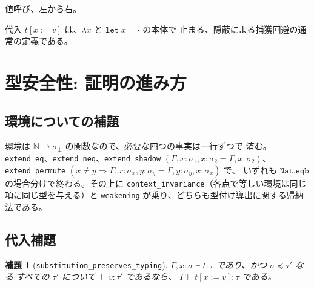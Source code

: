 \documentclass[11pt,a4paper]{ltjsarticle}
\newtheorem{lemma}[theorem]{補題}
\newcommand{\inst}{\preceq}
\newcommand{\subst}[3]{#1[#2 := #3]}
\newcommand{\step}{\longrightarrow}
\begin{document}
値呼び、左から右。


代入 $\subst{t}{x}{v}$ は、$\lambda x$ と $\mathtt{let}\;x = \cdot$ の本体で
止まる、隠蔽による捕獲回避の通常の定義である。

\section{型安全性: 証明の進み方}
\label{sec:safe-proof}

\subsection{環境についての補題}

環境は $\mathbb{N} \to \sigma_\bot$ の関数なので、必要な四つの事実は一行ずつで
済む。\texttt{extend\_eq}、\texttt{extend\_neq}、\texttt{extend\_shadow}
$(\Gamma, x{:}\sigma_1, x{:}\sigma_2 = \Gamma, x{:}\sigma_2)$、
\texttt{extend\_permute} $(x \neq y \Rightarrow
\Gamma, x{:}\sigma_x, y{:}\sigma_y = \Gamma, y{:}\sigma_y, x{:}\sigma_x)$ で、
いずれも $\mathtt{Nat.eqb}$ の場合分けで終わる。その上に
\texttt{context\_invariance}（各点で等しい環境は同じ項に同じ型を与える）と
\texttt{weakening} が乗り、どちらも型付け導出に関する帰納法である。

\subsection{代入補題}

\begin{lemma}[\texttt{substitution\_preserves\_typing}]
  $\Gamma, x{:}\sigma \vdash t : \tau$ であり、かつ $\sigma \inst \tau'$ なる
  \emph{すべての} $\tau'$ について $\vdash v : \tau'$ であるなら、
  $\Gamma \vdash \subst{t}{x}{v} : \tau$ である。
\end{lemma}
\end{document}
